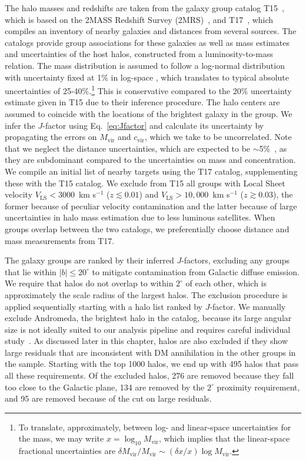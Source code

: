 The halo masses and redshifts are taken from the galaxy group catalog T15~\cite{Tully:2015opa}, which is based on the 2MASS Redshift Survey (2MRS)~\cite{Crook:2006sw}, and T17~\cite{2017ApJ...843...16K}, which compiles an inventory of nearby galaxies and distances from several sources.  The catalogs provide group associations for these galaxies as well as mass estimates and uncertainties of the host halos, constructed from a luminosity-to-mass relation. The mass distribution is assumed to follow a log-normal distribution with uncertainty fixed at 1\% in log-space \cite{companion}, which translates to typical absolute uncertainties of 25-40\%.\footnote{To translate, approximately, between log- and linear-space uncertainties for the mass, we may write $x = \log_{10} M_\text{vir}$, which implies that the linear-space fractional uncertainties are $\delta M_\text{vir} / M_\text{vir} \sim (\delta x / x) \log M_\text{vir}$. } This is conservative compared to the 20\% uncertainty estimate given in T15 due to their inference procedure. The halo centers are assumed to coincide with the locations of the brightest galaxy in the group.  We infer the $J$-factor using Eq.~\ref{eq:Jfactor} and calculate its uncertainty by propagating the errors on $M_\text{vir}$ and $c_\text{vir}$, which we take to be uncorrelated.  Note that we neglect the distance uncertainties, which are expected to be $\sim$5\%~\cite{Tully:2016ppz,2017ApJ...843...16K}, as they are subdominant compared to the uncertainties on mass and concentration.  We compile an initial list of nearby targets using the T17 catalog, supplementing these with the T15 catalog.  We exclude from T15 all groups with Local Sheet velocity $V_\text{LS} < 3000$~km s$^{-1}$ ($z \lesssim 0.01$) and $V_\text{LS} > 10,000$~km s$^{-1}$ ($z \gtrsim 0.03$), the former because of peculiar velocity contamination and the latter because of large uncertainties in halo mass estimation due to less luminous satellites.  When groups overlap between the two catalogs, we preferentially choose distance and mass measurements from T17.

The galaxy groups are ranked by their inferred $J$-factors, excluding any groups that lie within $|b| \leq 20^\circ$ to mitigate contamination from Galactic diffuse emission.  We require that halos do not overlap to within $2^\circ$ of each other, which is approximately the scale radius of the largest halos.  The exclusion procedure is applied sequentially starting with a halo list ranked by $J$-factor.  We manually exclude Andromeda, the brightest halo in the catalog, because its large angular size is not ideally suited to our analysis pipeline and requires careful individual study~\cite{Ackermann:2017nya}.  
As discussed later in this chapter, halos are also excluded if they show large residuals that are inconsistent with DM annihilation in the other groups in the sample.  Starting with the top 1000 halos, we end up with 495 halos that pass all these requirements.  Of the excluded halos, 276 are removed because they fall too close to the Galactic plane, 134 are removed by the $2^\circ$ proximity requirement, and 95 are removed because of the cut on large residuals. 

